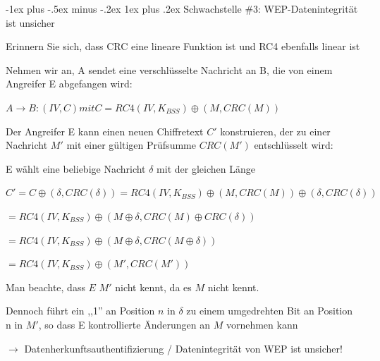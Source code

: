\documentclass[a4paper]{article}
\makeatletter
\renewcommand{\subsubsection}{\@startsection{subsubsection}{3}{0mm}%
 {-1ex plus -.5ex minus -.2ex}%
 {1ex plus .2ex}%
 {\normalfont\small\bfseries}}
\makeatother
\begin{document}
\begin{multicols}{3}
      \subsubsection{Schwachstelle \#3: WEP-Datenintegrität ist unsicher}
      \begin{itemize*}
            \item Erinnern Sie sich, dass CRC eine lineare Funktion ist und RC4 ebenfalls linear ist
            \item Nehmen wir an, A sendet eine verschlüsselte Nachricht an B, die von einem Angreifer E abgefangen wird:
            \begin{itemize*}
                  \item $A \rightarrow B: (IV, C) mit C = RC4(IV, K_{BSS}) \oplus (M, CRC(M))$
            \end{itemize*}
            \item Der Angreifer E kann einen neuen Chiffretext $C'$ konstruieren, der zu einer Nachricht $M'$ mit einer gültigen Prüfsumme $CRC(M')$ entschlüsselt wird:
            \begin{itemize*}
                  \item E wählt eine beliebige Nachricht $\delta$ mit der gleichen Länge
                  \item $C' = C \oplus (\delta, CRC(\delta)) = RC4(IV, K_{BSS}) \oplus (M, CRC(M)) \oplus (\delta, CRC(\delta))$
                  \item $= RC4(IV, K_{BSS}) \oplus (M \oplus \delta, CRC(M) \oplus CRC(\delta))$
                  \item $= RC4(IV, K_{BSS}) \oplus (M \oplus \delta, CRC(M \oplus \delta))$
                  \item $= RC4(IV, K_{BSS}) \oplus (M', CRC(M'))$
                  \item Man beachte, dass $E$ $M'$ nicht kennt, da es $M$ nicht kennt.
                  \item Dennoch führt ein ,,1'' an Position $n$ in $\delta$ zu einem umgedrehten Bit an Position n in $M'$, so dass E kontrollierte Änderungen an $M$ vornehmen kann
                  \item[$\rightarrow$] Datenherkunftsauthentifizierung / Datenintegrität von WEP ist unsicher!
            \end{itemize*}
      \end{itemize*}


\end{multicols}
\end{document}
